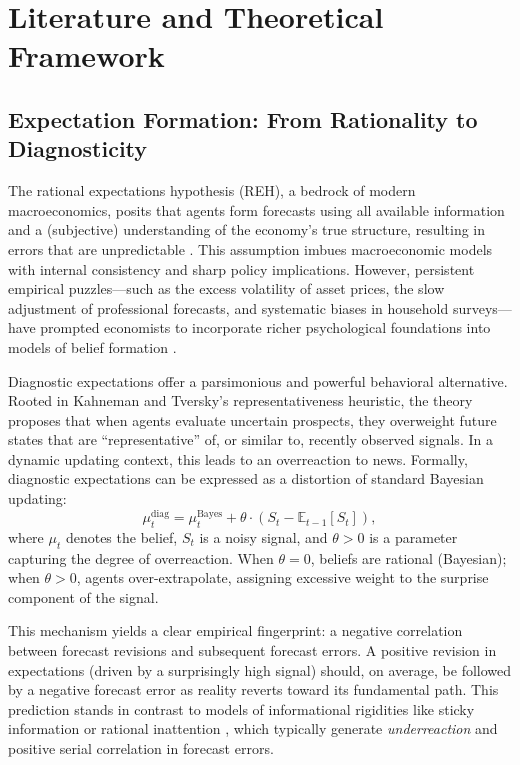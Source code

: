 \documentclass[12pt]{article}
\begin{document}
\section{Literature and Theoretical Framework}\label{sec:lit}
\subsection{Expectation Formation: From Rationality to Diagnosticity}
The rational expectations hypothesis (REH), a bedrock of modern macroeconomics, posits that agents form forecasts using all available information and a (subjective) understanding of the economy's true structure, resulting in errors that are unpredictable \cite{Muth1961, Lucas1972}. This assumption imbues macroeconomic models with internal consistency and sharp policy implications. However, persistent empirical puzzles—such as the excess volatility of asset prices, the slow adjustment of professional forecasts, and systematic biases in household surveys—have prompted economists to incorporate richer psychological foundations into models of belief formation \cite{Shiller2000, Akerlof2009}.

Diagnostic expectations \cite{Bordalo2018} offer a parsimonious and powerful behavioral alternative. Rooted in Kahneman and Tversky's representativeness heuristic, the theory proposes that when agents evaluate uncertain prospects, they overweight future states that are ``representative'' of, or similar to, recently observed signals. In a dynamic updating context, this leads to an overreaction to news. Formally, diagnostic expectations can be expressed as a distortion of standard Bayesian updating:
\[
    \mu_t^{\text{diag}} = \mu_t^{\text{Bayes}} + \theta \cdot (S_t - \mathbb{E}_{t-1}[S_t]),
\]
where $\mu_t$ denotes the belief, $S_t$ is a noisy signal, and $\theta > 0$ is a parameter capturing the degree of overreaction. When $\theta=0$, beliefs are rational (Bayesian); when $\theta>0$, agents over-extrapolate, assigning excessive weight to the surprise component of the signal.

This mechanism yields a clear empirical fingerprint: a negative correlation between forecast revisions and subsequent forecast errors. A positive revision in expectations (driven by a surprisingly high signal) should, on average, be followed by a negative forecast error as reality reverts toward its fundamental path. This prediction stands in contrast to models of informational rigidities like sticky information \cite{Mankiw2002} or rational inattention \cite{Sims2003}, which typically generate \emph{underreaction} and positive serial correlation in forecast errors.
\end{document}
